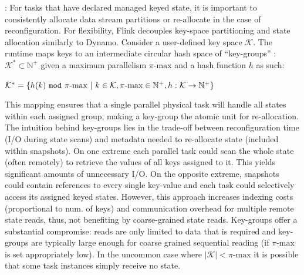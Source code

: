 : For tasks that have declared managed keyed state, it is important to consistently allocate data stream partitions or re-allocate in the case of reconfiguration. For flexibility, Flink decouples key-space partitioning and state allocation similarly to Dynamo\cite{decandia2007dynamo}. Consider a user-defined key space $\mathcal{K}$. The runtime maps keys to an intermediate circular hash space of ``key-groups'' : $\mathcal{K}^* \subset \mathbb{N^+}$ given a maximum parallelism $\pi\text{-max}$ and a hash function $h$ as such:

\noindent $\mathcal{K}^* = \{ h(k)\text{ \texttt{mod} }\pi\text{-max}\text{ }|\text{ }k \in \mathcal{K}, \pi\text{-max} \in \mathbb{N^+}, h: \mathcal{K} \rightarrow \mathbb{N^+} \}$

\noindent This mapping ensures that a single parallel physical task will handle all states within each assigned group, making a key-group the atomic unit for re-allocation. The intuition behind key-groups lies in the trade-off between reconfiguration time (I/O during state scans) and metadata needed to re-allocate state (included within snapshots). On one extreme each parallel task could scan the whole state (often remotely) to retrieve the values of all keys assigned to it. This yields significant amounts of unnecessary I/O. 
On the opposite extreme, snapshots could contain references to every single key-value and each task could selectively access its assigned keyed states. However, this approach increases indexing costs (proportional to num. of keys) and communication overhead for multiple remote state reads, thus, not benefiting by coarse-grained state reads. Key-groups offer a substantial compromise: reads are only limited to data that is required and key-groups are typically large enough for coarse grained sequential reading (if $\pi\text{-max}$ is set appropriately low). In the uncommon case where $|\mathcal{K}| < \pi\text{-max}$ it is possible that some task instances simply receive no state.


